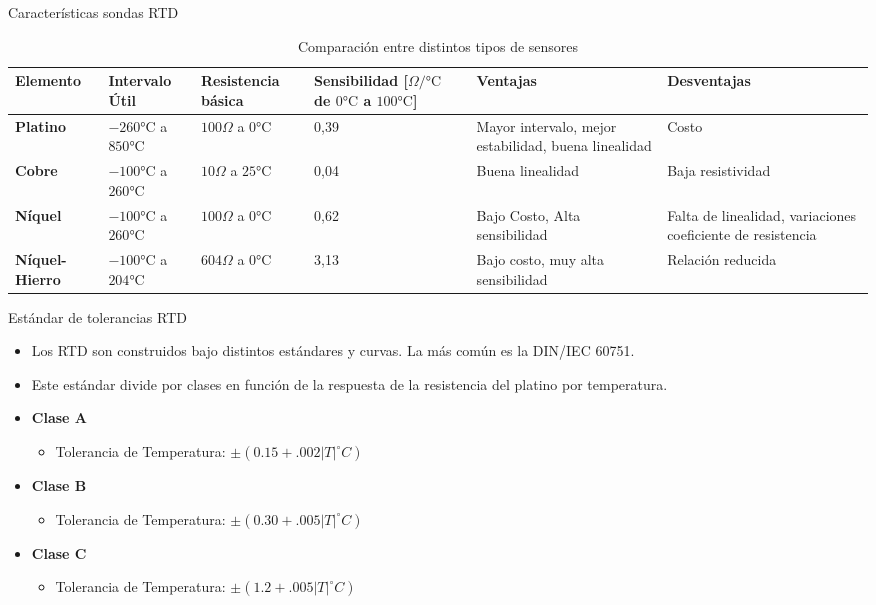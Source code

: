 \documentclass[aspectratio=169]{beamer}
\begin{document}
\begin{frame}{Características sondas RTD}
  \begin{table}[]
    \centering
    \scriptsize{
    \begin{tabular}{m{1.1cm} m{2.2cm} m{1.5cm} m{1.8cm} m{2.6cm} m{2.6cm}}
    \toprule
        \textbf{Elemento} & \textbf{Intervalo Útil} &\textbf{Resistencia básica} & \textbf{Sensibilidad [$\Omega/\si{\celsius}$ de $0\si{\celsius}$ a $100\si{\celsius}$]} & \textbf{Ventajas} & \textbf{Desventajas}\\
    \midrule
       \textbf{Platino} & $-260\si{\celsius}$ a $ 850\si{\celsius}$ & $100\Omega$ a $0\si{\celsius}$   & 0,39 & Mayor intervalo, mejor estabilidad, buena linealidad & Costo\\
       \textbf{Cobre} & $-100\si{\celsius}$ a $ 260\si{\celsius}$ & $10\Omega$ a $25\si{\celsius}$   & 0,04 & Buena linealidad & Baja resistividad\\
       \textbf{Níquel} &  $-100\si{\celsius}$ a $ 260\si{\celsius}$ & $100\Omega$ a $0\si{\celsius}$   & 0,62 & Bajo Costo, Alta sensibilidad & Falta de linealidad, variaciones coeficiente de resistencia\\
       \textbf{Níquel-Hierro} & $-100\si{\celsius}$ a $ 204\si{\celsius}$ & $604\Omega$ a $0\si{\celsius}$   & 3,13 & Bajo costo, muy alta sensibilidad & Relación reducida\\
    \bottomrule
    \end{tabular}
    }
    \caption{Comparación entre distintos tipos de sensores\cite{sole2005instrumentacion}}
    \label{tab:Caracteristicas _rtd}
\end{table}
\end{frame}

\begin{frame}{Estándar de tolerancias RTD}
 \begin{itemize}
     \item Los RTD son construidos bajo distintos estándares y curvas. La más común es la DIN/IEC 60751.
     \item Este estándar divide por clases en función de la respuesta de la resistencia del platino por temperatura. 
     \item \textbf{Clase A}
     \begin{itemize}
         \item Tolerancia de Temperatura: $\pm (0.15 + .002|T| ^\circ C)$
     \end{itemize}
      \item \textbf{Clase B}
     \begin{itemize}
         \item Tolerancia de Temperatura: $\pm (0.30 + .005|T| ^\circ C)$
         \end{itemize}
    \item \textbf{Clase C}
     \begin{itemize}
         \item Tolerancia de Temperatura: $\pm (1.2 + .005|T| ^\circ C)$
     \end{itemize}
 \end{itemize}
\end{frame}
\end{document}
